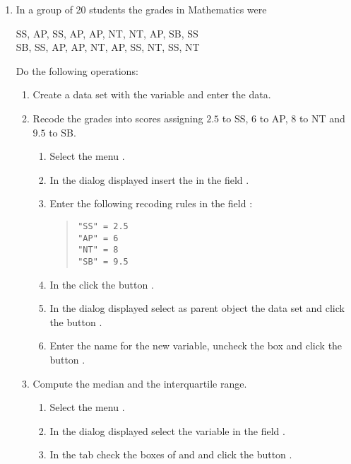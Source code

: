\begin{enumerate}[leftmargin=*]
\item In a group of 20 students the grades in Mathematics were
\begin{center}
SS, AP, SS, AP, AP, NT, NT, AP, SB, SS \\
SB, SS, AP, AP, NT, AP, SS, NT, SS, NT
\end{center}

Do the following operations:
\begin{enumerate}
\item  Create a data set  with the variable  and enter the data.

\item  Recode the grades into scores assigning $2.5$ to SS, $6$ to AP, $8$ to NT and $9.5$ to SB.
\begin{indication}
\begin{enumerate}
\item Select the menu .
\item In the dialog displayed insert the  in the field .
\item Enter the following recoding rules in the field :
\begin{quote}
\lstinline{"SS" = 2.5}\\
\lstinline{"AP" = 6}\\
\lstinline{"NT" = 8}\\
\lstinline{"SB" = 9.5}
\end{quote}
\item In the  click the button .
\item In the dialog displayed select as parent object the data set  and click
the button .
\item Enter the name  for the new variable, uncheck the box  and click the
button .
\end{enumerate}
\end{indication}

\item Compute the median and the interquartile range.
\begin{indication}
\begin{enumerate}
\item Select the menu .
\item In the dialog displayed select the variable  in the field .
\item In the  tab check the boxes of  and  and click the button .
\end{enumerate}
\end{indication}
\end{enumerate}


\end{enumerate}
